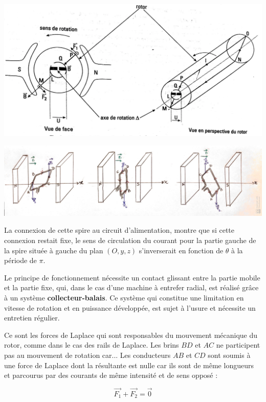 \documentclass{article}
\begin{document}
\begin{center}
    \includegraphics[scale=0.3]{mcc.png}
\end{center}


\begin{center}
    \includegraphics[scale=0.17]{spiretournemcc.jpg}
\end{center}

La connexion de cette spire au circuit d'alimentation, montre que si cette connexion restait fixe, le sens de circulation du courant pour la partie gauche de la spire située à gauche du plan $(O,y,z)$ s'inverserait en fonction de $\theta$ à la période de $\pi$. \medskip

Le principe de fonctionnement nécessite un contact glissant entre la partie mobile et la partie fixe, qui, dans le cas d'une machine à entrefer radial, est réalisé grâce à un système \textbf{collecteur-balais}. Ce système qui constitue une limitation en vitesse de rotation et en puissance développée, est sujet à l'usure et nécessite un entretien régulier.\medskip

Ce sont les forces de Laplace qui sont responsables du mouvement mécanique du rotor, comme dans le cas des rails de Laplace. Les brins $BD$ et $AC$ ne participent pas au mouvement de rotation car... Les conducteurs $AB$ et $CD$ sont soumis à une force de Laplace dont la résultante est nulle car ils sont de même longueurs et parcourus par des courants de même intensité et de sens opposé :

\begin{equation}
    \Vec{F_1} + \Vec{F_2} = \Vec{0}
\end{equation}
\end{document}
